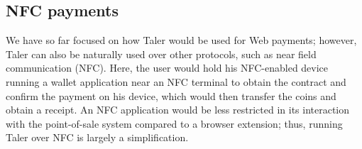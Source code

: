 \documentclass{IEEEtran}
\begin{document}
%
%
%
%
%


\subsection{NFC payments}

We have so far focused on how Taler would be used for Web payments;
however, Taler can also be naturally used over other protocols, such
as near field communication (NFC).  Here, the user would hold his
NFC-enabled device running a wallet application near an NFC terminal
to obtain the contract and confirm the payment on his device, which
would then transfer the coins and obtain a receipt.  An NFC
application would be less restricted in its interaction with the
point-of-sale system compared to a browser extension; thus, running
Taler over NFC is largely a simplification.
\end{document}
